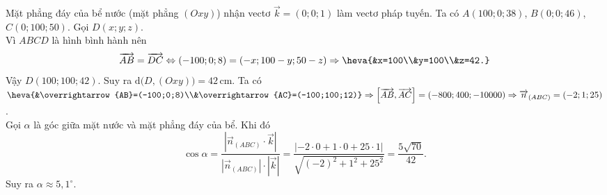 \begin{ex}
{\begin{itemchoice}
			\itemch Mặt phẳng đáy của bể nước (mặt phẳng $(Oxy)$) nhận vectơ $\overrightarrow{k}=(0;0;1)$ làm  vectơ pháp tuyến.
			 \itemch Ta có $A(100;0;38)$, $B(0;0;46)$, $C(0;100;50)$. Gọi $D(x;y;z)$.\\
			Vì  $ABCD$ là hình bình hành nên
			$$\overrightarrow{AB}=\overrightarrow{DC}\Leftrightarrow (-100;0;8)=(-x;100-y;50-z)\Rightarrow\heva{&x=100\\&y=100\\&z=42.}$$ 
			Vậy  $D(100;100;42)$. Suy ra $\mathrm{d}\big(D,(Oxy)\big)=42$\,cm.
			\itemch  Ta có $\heva{&\overrightarrow{AB}=(-100;0;8)\\&\overrightarrow{AC}=(-100;100;12)}\Rightarrow \left[\overrightarrow{AB}, \overrightarrow{AC}\right]=(-800;400;-10000)\Rightarrow \overrightarrow{n}_{(ABC)}=(-2;1;25)$.\\
			Gọi $\alpha$ là góc giữa mặt nước và mặt phẳng đáy của bể.  Khi đó\\
			$$\cos\alpha=\dfrac{\left|\overrightarrow{n}_{(ABC)}\cdot\overrightarrow{k}\right|}{\left|\overrightarrow{n}_{(ABC)}\right|\cdot\left|\overrightarrow{k}\right|}=\dfrac{\left|-2\cdot 0+1\cdot 0+25\cdot  1\right|}{\sqrt{(-2)^2+1^2+25^2}}=\dfrac{5\sqrt{70}}{42}.$$
			Suy ra $\alpha\approx 5{,}1^{\circ}$. 
		\end{itemchoice}
	 }
\end{ex}

